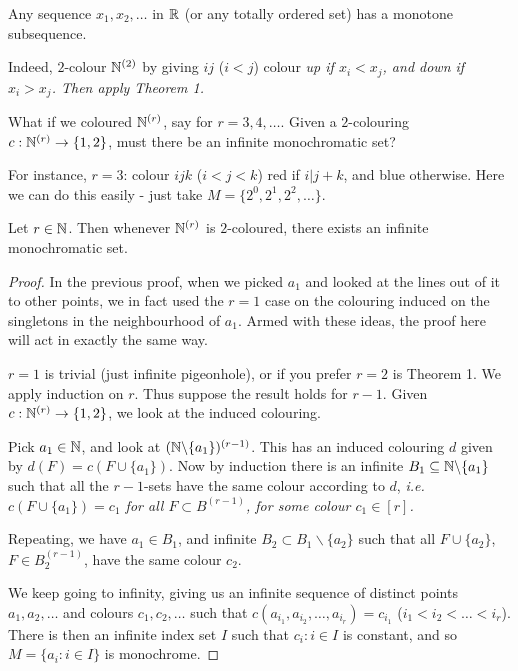 \documentclass[10pt]{article}
\begin{document}
\begin{remark*}[Example]
    Any sequence $x_1,x_2,\dots$ in $\mathbb{R}$ (or any totally ordered set) has a monotone subsequence.

    Indeed, $2$-colour $\mathbb{N}^{(2)}$ by giving $ij$ ($i<j$) colour \it{up} if $x_i < x_j$, and \it{down} if $x_i > x_j$. Then apply Theorem 1.
\end{remark*}


What if we coloured $\mathbb{N}^{(r)}$, say for $r = 3,4,\dots$. Given a $2$-colouring $c:\mathbb{N}^{(r)}\rightarrow \{1,2\}$, must there be an infinite monochromatic set?

For instance, $r = 3$: colour $ijk$ ($i < j < k$) red if $i | j+k$, and blue otherwise. Here we can do this easily - just take $M = \{2^0,2^1,2^2,\dots\}$.

\begin{theorem}
    Let $r \in \mathbb{N}$. Then whenever $\mathbb{N}^{(r)}$ is $2$-coloured, there exists an infinite monochromatic set.
\end{theorem}
\begin{proof}
    In the previous proof, when we picked $a_1$ and looked at the lines out of it to other points, we in fact used the $r = 1$ case on the colouring induced on the singletons in the neighbourhood of $a_1$. Armed with these ideas, the proof here will act in exactly the same way.

    $r = 1$ is trivial (just infinite pigeonhole), or if you prefer $r = 2$ is Theorem 1. We apply induction on $r$. Thus suppose the result holds for $r - 1$. Given $c:\mathbb{N}^{(r)}\rightarrow \{1,2\}$, we look at the induced colouring.

    Pick $a_1 \in \mathbb{N}$, and look at $(\mathbb{N}\backslash\{a_1\})^{(r-1)}$. This has an induced colouring $d$ given by $d(F) = c(F\cup\{a_1\})$. Now by induction there is an infinite $B_1\subseteq \mathbb{N}\backslash\{a_1\}$ such that all the $r-1$-sets have the same colour according to $d$, \it{i.e.} $c(F\cup\{a_1\}) = c_1$ for all $F\subset B^{(r-1)}$, for some colour $c_1 \in [r]$.

    Repeating, we have $a_1 \in B_1$, and infinite $B_2\subset B_1\backslash \{a_2\}$ such that all $F\cup \{a_2\}$, $F\in B_2^{(r-1)}$, have the same colour $c_2$.

    We keep going to infinity, giving us an infinite sequence of distinct points $a_1,a_2,\dots$ and colours $c_1,c_2,\dots$ such that $c(a_{i_1},a_{i_2},\dots,a_{i_r})=c_{i_1}$ ($i_1 < i_2 < \dots < i_r$). There is then an infinite index set $I$ such that $c_i:i\in I$ is constant, and so $M = \{a_i:i\in I\}$ is monochrome.
\end{proof}
\end{document}

